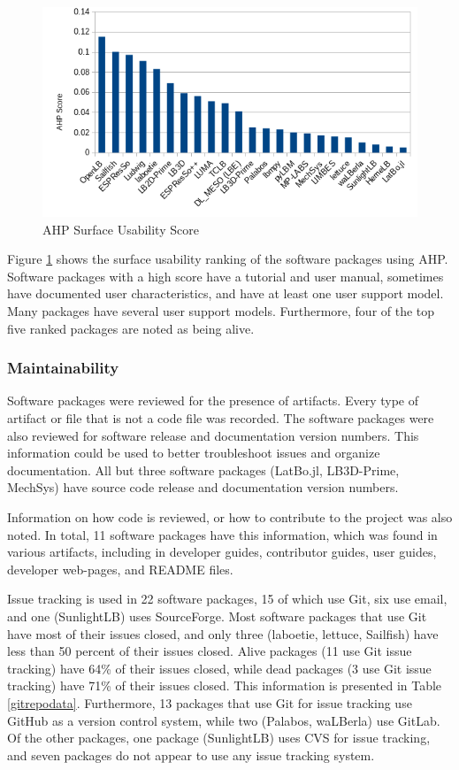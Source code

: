 \documentclass[12pt, notitlepage]{article}
\begin{document}
\begin{figure}[h!]
	\begin{center}
		\includegraphics[width=1.0\textwidth]{usability_chart}
		\caption{AHP Surface Usability Score}
		\label{Fig_Usability}
	\end{center}
\end{figure}

Figure \ref{Fig_Usability} shows the surface usability ranking of the software packages using AHP. Software packages with a high score have a tutorial and user manual, sometimes have documented user characteristics, and have at least one user support model. Many packages have several user support models. Furthermore, four of the top five ranked packages are noted as being alive. 

\subsubsection{Maintainability}

Software packages were reviewed for the presence of artifacts. Every type of artifact or file that is not a code file was recorded. The software packages were also reviewed for software release and documentation version numbers. This information could be used to better troubleshoot issues and organize documentation. All but three software packages (LatBo.jl, LB3D-Prime, MechSys) have source code release and documentation version numbers.

Information on how code is reviewed, or how to contribute to the project was also noted. In total, 11 software packages have this information, which was found in various artifacts, including in developer guides, contributor guides, user guides, developer web-pages, and README files. 

Issue tracking is used in 22 software packages, 15 of which use Git, six use email, and one (SunlightLB) uses SourceForge. Most software packages that use Git have most of their issues closed, and only three (laboetie, lettuce, Sailfish) have less than 50 percent of their issues closed. Alive packages (11 use Git issue tracking) have 64\% of their issues closed, while dead packages (3 use Git issue tracking) have 71\% of their issues closed. This information is presented in Table \ref{gitrepodata}. Furthermore, 13 packages that use Git for issue tracking use GitHub as a version control system, while two (Palabos, waLBerla) use GitLab. Of the other packages, one package (SunlightLB) uses CVS for issue tracking, and seven packages do not appear to use any issue tracking system.
\end{document}
